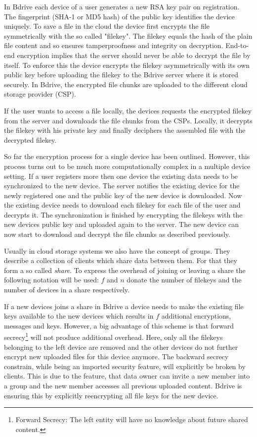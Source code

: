 In Bdrive each device of a user generates a new \ac{RSA} key pair on registration. The fingerprint (SHA-1 or MD5 hash) of the public key identifies the device uniquely. To save a file in the cloud the device first encrypts the file symmetrically with the so called "filekey". The filekey equals the hash of the plain file content and so ensures tamperproofness and integrity on decryption. End-to-end encryption implies that the server should never be able to decrypt the file by itself. To enforce this the device encrypts the filekey asymmetrically with its own public key before uploading the filekey to the Bdrive server where it is stored securely. In Bdrive, the encrypted file chunks are uploaded to the different cloud storage provider (\ac{CSP}). 

If the user wants to access a file locally, the devices requests the encrypted filekey from the server and downloads the file chunks from the \ac{CSP}s. Locally, it decrypts the filekey with his private key and finally deciphers the assembled file with the decrypted filekey. 

So far the encryption process for a single device has been outlined. However, this process turns out to be much more computationally complex in a multiple device setting.  If a user registers more then one device the existing data needs to be synchronized to the new device. The server notifies the existing device for the newly registered one and the public key of the new device is downloaded. Now the existing device needs to download each filekey for each file of the user and decrypts it. The synchronization is finished by encrypting the filekeys with the new devices public key and uploaded again to the server. The new device can now start to download and decrypt the file chunks as described previously.

Usually in cloud storage systems we also have the concept of groups. They describe a collection of clients which share data between them. For that they form a so called \textit{share}. To express the overhead of joining or leaving a share the following notation will be used: $f$ and $n$ donate the number of filekeys and the number of devices in a share respectively.

If a new devices joins a share in Bdrive a device needs to make the existing file keys available to the new devices which results in $f$ additional encryptions, messages and keys. However, a big advantage of this scheme is that forward secrecy\footnote{Forward Secrecy: The left entity will have no knowledge about future shared content.} will not produce additional overhead. Here, only all the filekeys belonging to the left device are removed and the other devices do not further encrypt new uploaded files for this device anymore. The backward secrecy constrain, while being an imported security feature, will explicitly be broken by clients. This is due to the feature, that data owner can invite a new member into a group and the new member accesses all previous uploaded content. Bdrive is ensuring this by explicitly reencrypting all file keys for the new device. 

